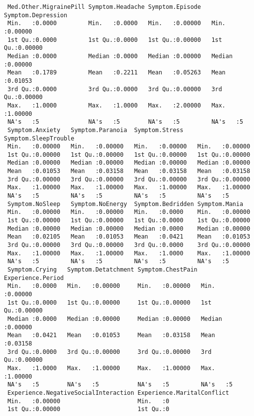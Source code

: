 \documentclass[11pt]{article}
\begin{document}
\begin{verbatim}
 Med.Other.MigrainePill Symptom.Headache Symptom.Episode   Symptom.Depression
 Min.   :0.0000         Min.   :0.0000   Min.   :0.00000   Min.   :0.00000   
 1st Qu.:0.0000         1st Qu.:0.0000   1st Qu.:0.00000   1st Qu.:0.00000   
 Median :0.0000         Median :0.0000   Median :0.00000   Median :0.00000   
 Mean   :0.1789         Mean   :0.2211   Mean   :0.05263   Mean   :0.01053   
 3rd Qu.:0.0000         3rd Qu.:0.0000   3rd Qu.:0.00000   3rd Qu.:0.00000   
 Max.   :1.0000         Max.   :1.0000   Max.   :2.00000   Max.   :1.00000   
 NA's   :5              NA's   :5        NA's   :5         NA's   :5         
 Symptom.Anxiety   Symptom.Paranoia  Symptom.Stress    Symptom.SleepTrouble
 Min.   :0.00000   Min.   :0.00000   Min.   :0.00000   Min.   :0.00000     
 1st Qu.:0.00000   1st Qu.:0.00000   1st Qu.:0.00000   1st Qu.:0.00000     
 Median :0.00000   Median :0.00000   Median :0.00000   Median :0.00000     
 Mean   :0.01053   Mean   :0.03158   Mean   :0.03158   Mean   :0.03158     
 3rd Qu.:0.00000   3rd Qu.:0.00000   3rd Qu.:0.00000   3rd Qu.:0.00000     
 Max.   :1.00000   Max.   :1.00000   Max.   :1.00000   Max.   :1.00000     
 NA's   :5         NA's   :5         NA's   :5         NA's   :5           
 Symptom.NoSleep   Symptom.NoEnergy  Symptom.Bedridden Symptom.Mania    
 Min.   :0.00000   Min.   :0.00000   Min.   :0.0000    Min.   :0.00000  
 1st Qu.:0.00000   1st Qu.:0.00000   1st Qu.:0.0000    1st Qu.:0.00000  
 Median :0.00000   Median :0.00000   Median :0.0000    Median :0.00000  
 Mean   :0.02105   Mean   :0.01053   Mean   :0.0421    Mean   :0.01053  
 3rd Qu.:0.00000   3rd Qu.:0.00000   3rd Qu.:0.0000    3rd Qu.:0.00000  
 Max.   :1.00000   Max.   :1.00000   Max.   :1.0000    Max.   :1.00000  
 NA's   :5         NA's   :5         NA's   :5         NA's   :5        
 Symptom.Crying   Symptom.Detatchment Symptom.ChestPain Experience.Period
 Min.   :0.0000   Min.   :0.00000     Min.   :0.00000   Min.   :0.00000  
 1st Qu.:0.0000   1st Qu.:0.00000     1st Qu.:0.00000   1st Qu.:0.00000  
 Median :0.0000   Median :0.00000     Median :0.00000   Median :0.00000  
 Mean   :0.0421   Mean   :0.01053     Mean   :0.03158   Mean   :0.03158  
 3rd Qu.:0.0000   3rd Qu.:0.00000     3rd Qu.:0.00000   3rd Qu.:0.00000  
 Max.   :1.0000   Max.   :1.00000     Max.   :1.00000   Max.   :1.00000  
 NA's   :5        NA's   :5           NA's   :5         NA's   :5        
 Experience.NegativeSocialInteraction Experience.MaritalConflict
 Min.   :0.00000                      Min.   :0                 
 1st Qu.:0.00000                      1st Qu.:0                 

\end{verbatim}
\end{document}
